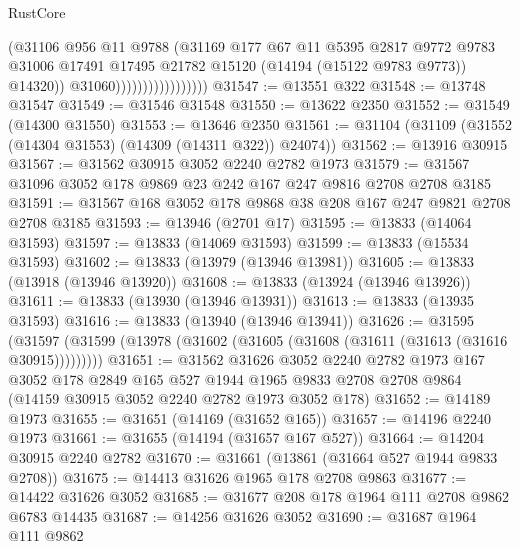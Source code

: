 \begin{lexlean}{RustCore}
\begin{coremodule}
                                      (@31106
                                        @956
                                        @11
                                        @9788
                                        (@31169
                                          @177
                                          @67
                                          @11
                                          @5395
                                          @2817
                                          @9772
                                          @9783
                                          @31006
                                          @17491
                                          @17495
                                          @21782
                                          @15120
                                          (@14194 (@15122 @9783 @9773))
                                          @14320))
                                      @31060)))))))))))))))))
@31547 := @13551 @322
@31548 := @13748 @31547
@31549 := @31546 @31548
@31550 := @13622 @2350
@31552 := @31549 (@14300 @31550)
@31553 := @13646 @2350
@31561 := @31104 (@31109 (@31552 (@14304 @31553) (@14309 (@14311 @322)) @24074))
@31562 := @13916 @30915
@31567 := @31562 @30915 @3052 @2240 @2782 @1973
@31579 := @31567 @31096 @3052 @178 @9869 @23 @242 @167 @247 @9816 @2708 @2708 @3185
@31591 := @31567 @168 @3052 @178 @9868 @38 @208 @167 @247 @9821 @2708 @2708 @3185
@31593 := @13946 (@2701 @17)
@31595 := @13833 (@14064 @31593)
@31597 := @13833 (@14069 @31593)
@31599 := @13833 (@15534 @31593)
@31602 := @13833 (@13979 (@13946 @13981))
@31605 := @13833 (@13918 (@13946 @13920))
@31608 := @13833 (@13924 (@13946 @13926))
@31611 := @13833 (@13930 (@13946 @13931))
@31613 := @13833 (@13935 @31593)
@31616 := @13833 (@13940 (@13946 @13941))
@31626 := @31595
    (@31597 (@31599 (@13978 (@31602 (@31605 (@31608 (@31611 (@31613 (@31616 @30915)))))))))
@31651 := @31562
    @31626
    @3052
    @2240
    @2782
    @1973
    @167
    @3052
    @178
    @2849
    @165
    @527
    @1944
    @1965
    @9833
    @2708
    @2708
    @9864
    (@14159 @30915 @3052 @2240 @2782 @1973 @3052 @178)
@31652 := @14189 @1973
@31655 := @31651 (@14169 (@31652 @165))
@31657 := @14196 @2240 @1973
@31661 := @31655 (@14194 (@31657 @167 @527))
@31664 := @14204 @30915 @2240 @2782
@31670 := @31661 (@13861 (@31664 @527 @1944 @9833 @2708))
@31675 := @14413 @31626 @1965 @178 @2708 @9863
@31677 := @14422 @31626 @3052
@31685 := @31677 @208 @178 @1964 @111 @2708 @9862 @6783 @14435
@31687 := @14256 @31626 @3052
@31690 := @31687 @1964 @111 @9862

\end{coremodule}
\end{lexlean}
